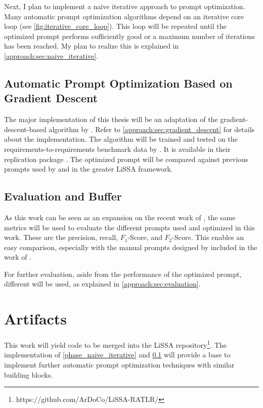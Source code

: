 Next, I plan to implement a naive iterative approach to prompt optimization. Many automatic prompt optimization algorithms \citeiterative depend on an iterative core loop (see \autoref{fig:iterative_core_loop}). This loop will be repeated until the optimized prompt performs sufficiently good or a maximum number of iterations has been reached. My plan to realize this is explained in \autoref{approach:sec:naive_iterative}.

\subsection{Automatic Prompt Optimization Based on Gradient Descent}
\label{phase_gradient_descent}
The major implementation of this thesis will be an adaptation of the gradient-descent-based \APO algorithm by . Refer to \autoref{approach:sec:gradient_descent} for details about the implementation.
The \APO algorithm will be trained and tested on the requirements-to-requirements benchmark data by \citeauthor{hey2025RequirementsTraceability}. It is available in their replication package \cite{hey2025ReplicationPackage}. The optimized prompt will be compared against previous prompts used by \citeauthor{fuchss2025LiSSAGeneric} and \citeauthor{hey2025RequirementsTraceability} in the greater LiSSA framework.


\subsection{Evaluation and Buffer}
\label{phase_evaluation}
As this work can be seen as an expansion on the recent work of , the same metrics will be used to evaluate the different prompts used and optimized in this work. These are the precision, recall, $F_1$-Score, and $F_2$-Score. This enables an easy comparison, especially with the manual prompts designed by  included in the work of \citeauthor{hey2025RequirementsTraceability}.

For further evaluation, aside from the performance of the optimized prompt, different \LLMs will be used, as explained in \autoref{approach:sec:evaluation}.




\section{Artifacts}
\label{sec:work_artifacts}
This work will yield code to be merged into the LiSSA repository\footnote{https://github.com/ArDoCo/LiSSA-RATLR/}. The implementation of \ref{phase_naive_iterative} and \ref{phase_gradient_descent} will provide a base to implement further automatic prompt optimization techniques with similar building blocks.

